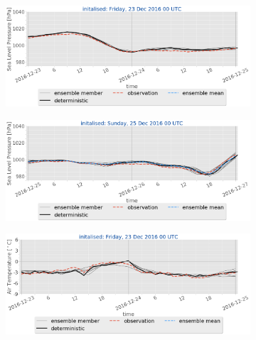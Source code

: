 \begin{figure}[H]
	\centering
	\begin{subfigure}[b]{0.49\textwidth}
		\includegraphics[trim={0.cm 5.cm 0cm 0cm},clip,
		width=\textwidth]{./fig_sfc_pressure/20161223_00}
		\caption{}\label{fig:res:sfc_pres23}
	\end{subfigure}
	\begin{subfigure}[b]{0.49\textwidth}
		\includegraphics[trim={0.cm 5.cm 0cm 0cm},clip,
		width=\textwidth]{./fig_sfc_pressure/20161225_00}
		\caption{}\label{fig:res:sfc_pres25}
	\end{subfigure}
	\begin{subfigure}[b]{0.49\textwidth}
		\includegraphics[trim={0.cm 5.cm 0cm 0cm},clip,
		width=\textwidth]{./fig_sfc_temp/20161223_00}
		\caption{}\label{fig:res:sfc_temp23}
	\end{subfigure}
	\begin{subfigure}[b]{0.49\textwidth}

\end{subfigure}
\end{figure}
